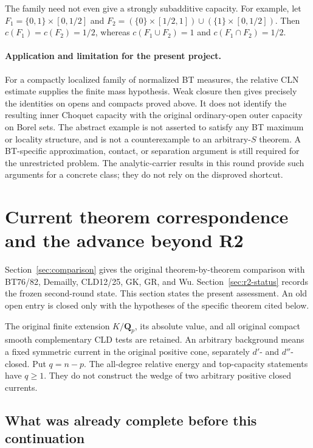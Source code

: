 \documentclass[11pt,a4paper]{article}
\numberwithin{equation}{section}
\theoremstyle{definition}
\theoremstyle{remark}
\begin{document}
The family need not even give a strongly subadditive capacity.
For example, let $F_1=\{0,1\}\times[0,1/2]$ and
$F_2=(\{0\}\times[1/2,1])\cup(\{1\}\times[0,1/2])$.
Then $c(F_1)=c(F_2)=1/2$, whereas
$c(F_1\cup F_2)=1$ and $c(F_1\cap F_2)=1/2$.

\paragraph{Application and limitation for the present project.}
For a compactly localized family of normalized BT measures, the
relative CLN estimate supplies the finite mass hypothesis.  Weak
closure then gives precisely the identities on opens and compacts
proved above.  It does not identify the resulting inner Choquet
capacity with the original ordinary-open outer capacity on Borel
sets.  The abstract example is not asserted to satisfy any BT
maximum or locality structure, and is not a counterexample to an
arbitrary-$S$ theorem.  A BT-specific approximation, contact, or
separation argument is still required for the unrestricted problem.
The analytic-carrier results in this round provide such arguments
for a concrete class; they do not rely on the disproved shortcut.



\section{Current theorem correspondence and the advance beyond R2}
\label{sec:r3-status}

Section~\ref{sec:comparison} gives the original theorem-by-theorem
comparison with BT76/82, Demailly, CLD12/25, GK, GR, and Wu.
Section~\ref{sec:r2-status} records the frozen second-round state.
This section states the present assessment. An old open entry is
closed only with the hypotheses of the specific theorem cited below.

The original finite extension $K/\mathbf Q_p$, its absolute value,
and all original compact smooth complementary CLD tests are retained.
An arbitrary background means a fixed symmetric current in the
original positive cone, separately $d'$- and $d''$-closed.
Put $q=n-p$. The all-degree relative energy and top-capacity
statements have $q\geq1$. They do not construct the wedge of two
arbitrary positive closed currents.

\subsection{What was already complete before this continuation}
\end{document}

